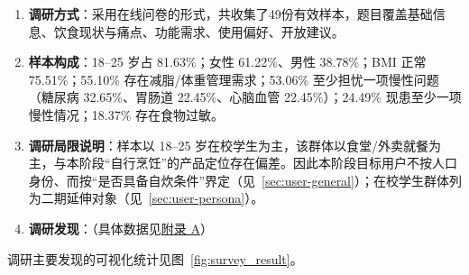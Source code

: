 \documentclass[12pt,a4paper]{ctexart}
\begin{document}
\begin{enumerate}
  \item \textbf{调研方式}：采用在线问卷的形式，共收集了49份有效样本，题目覆盖基础信息、饮食现状与痛点、功能需求、使用偏好、开放建议。
  \item \textbf{样本构成}：18--25 岁占 81.63\%；女性 61.22\%、男性 38.78\%；BMI 正常 75.51\%；55.10\% 存在减脂/体重管理需求；53.06\% 至少担忧一项慢性问题（糖尿病 32.65\%、胃肠道 22.45\%、心脑血管 22.45\%）；24.49\% 现患至少一项慢性情况；18.37\% 存在食物过敏。
  \item \textbf{调研局限说明}：样本以 18--25 岁在校学生为主，该群体以食堂/外卖就餐为主，与本阶段“自行烹饪”的产品定位存在偏差。因此本阶段目标用户不按人口身份、而按“是否具备自炊条件”界定（见~\ref{sec:user-general}）；在校学生群体列为二期延伸对象（见~\ref{sec:user-persona}）。
  \item \textbf{调研发现}：（具体数据见\hyperref[appendix:a]{附录 A}）
\end{enumerate}

调研主要发现的可视化统计见图~\ref{fig:survey_result}。
\end{document}

